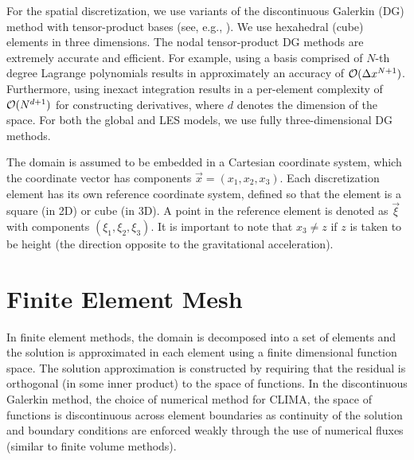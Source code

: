\documentclass{report}
\begin{document}
For the spatial discretization, we use variants of the discontinuous Galerkin (DG) method with tensor-product bases (see, e.g., \citealt{giraldo:2008a,abdi:2016}). We use hexahedral (cube) elements in three dimensions.  The nodal tensor-product DG methods are extremely accurate and efficient.  For example, using a basis comprised of $N$-th degree Lagrange polynomials results in approximately an accuracy of $\mathcal{O}(\Delta x^{N+1})$. Furthermore, using inexact integration results in a per-element complexity of $\mathcal{O}(N^{d+1})$ for constructing derivatives, where $d$ denotes the dimension of the space. For both the global and LES models, we use fully three-dimensional DG methods.

The domain is assumed to be embedded in a Cartesian coordinate system, which the coordinate vector has components $\vec{x} = (x_{1}, x_{2}, x_{3})$. Each discretization element has its own reference coordinate system, defined so that the element is a square (in 2D) or cube (in 3D). A point in the reference element is denoted as $\vec{\xi}$ with components $(\xi_{1}, \xi_{2}, \xi_{3})$.  It is important to note that $x_{3} \ne z$ if $z$ is taken to be height (the direction opposite to the gravitational acceleration).


\section{Finite Element Mesh}
In finite element methods, the domain is decomposed into a set of elements and
the solution is approximated in each element using a finite dimensional function
space. The solution approximation is constructed by requiring that the residual
is orthogonal (in some inner product) to the space of functions. In the
discontinuous Galerkin method, the choice of numerical method for CLIMA,
the space of functions is discontinuous across element boundaries as continuity
of the solution and boundary conditions are enforced weakly through the use of
numerical fluxes (similar to finite volume methods).
\end{document}
